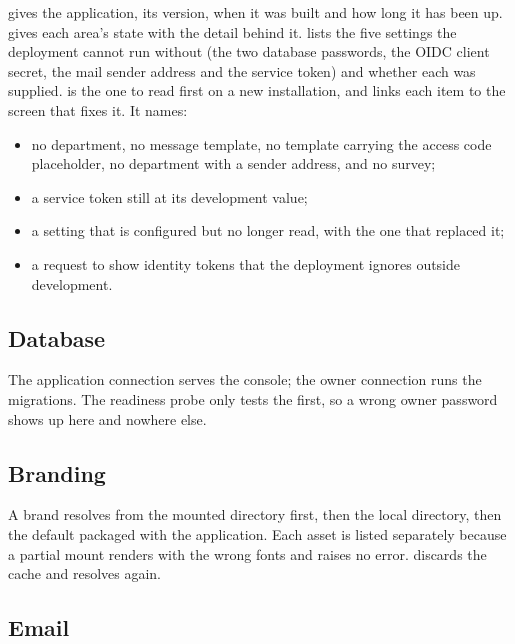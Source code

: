 \documentclass[11pt, a4paper]{article}
\begin{document}
 gives the application, its version, when it was built and how long it has been up.
 gives each area's state with the detail behind it.  lists the
five settings the deployment cannot run without (the two database passwords, the OIDC client
secret, the mail sender address and the service token) and whether each was supplied.
 is the one to read first on a new installation, and links each item
to the screen that fixes it. It names:

\begin{itemize}
  \item no department, no message template, no template carrying the access code placeholder,
        no department with a sender address, and no survey;
  \item a service token still at its development value;
  \item a setting that is configured but no longer read, with the one that replaced it;
  \item a request to show identity tokens that the deployment ignores outside development.
\end{itemize}

\subsection{Database}


The application connection serves the console; the owner connection runs the migrations. The
readiness probe only tests the first, so a wrong owner password shows up here and nowhere else.

\subsection{Branding}


A brand resolves from the mounted directory first, then the local directory, then the default
packaged with the application. Each asset is listed separately because a partial mount renders
with the wrong fonts and raises no error.  discards the cache and resolves
again.

\subsection{Email}
\end{document}
